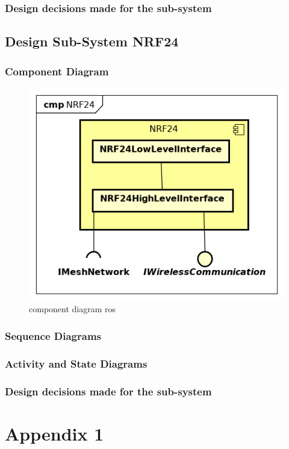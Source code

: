 \documentclass[a4paper, 11pt, oneside]{report}
\begin{document}
\subsection{Design decisions made for the sub-system}
\label{DetailedDesign:WirelessSimulatie:decisions}

\section{Design Sub-System NRF24}
\label{DetailedDesign:NRF24}
\subsection{Component Diagram}
\label{DetailedDesign:NRF24:ComponentDiagram}
\begin{figure}[H]
	\begin{center}\includegraphics[width=.5\linewidth]{Afbeeldingen/NRF24ComponentDiagram.png}\end{center}
	\caption{component diagram ros}
	\label{fig:component:NRF24}
\end{figure}
\subsection{Sequence Diagrams}
\label{DetailedDesign:NRF24:sequence}
\subsection{Activity and State Diagrams}
\label{DetailedDesign:NRF24:activity}
\subsection{Design decisions made for the sub-system}
\label{DetailedDesign:NRF24:decisions}





\clearpage
\appendix
\chapter{Appendix 1}
\label{app:iteratieplan}
\end{document}
